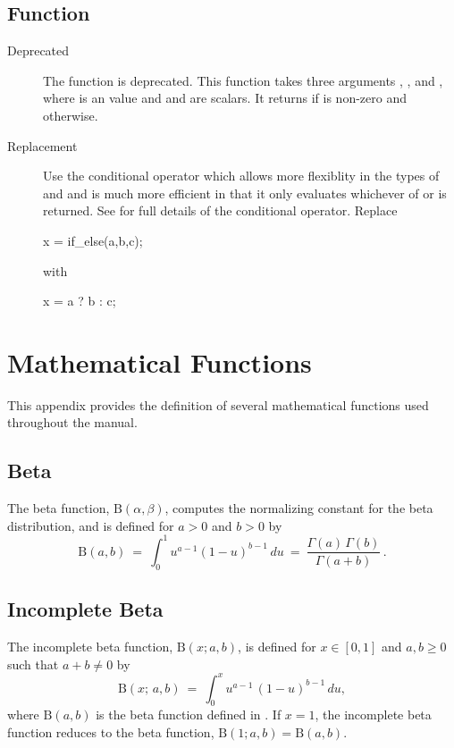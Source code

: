 \section{ Function}

\begin{description}
\item[Deprecated]The function  is deprecated.  This function takes three arguments
, , and , where  is an  value and  and 
are scalars. It returns  if  is non-zero and  otherwise.
%
\item[Replacement] Use the conditional operator which allows more
  flexiblity in the types of  and  and is much more
  efficient in that it only evaluates whichever of  or
   is returned.  See  for
  full details of the conditional operator.  Replace
\begin{stancode}
x = if_else(a,b,c);
\end{stancode}
 with
\begin{stancode}
x = a ? b : c;
\end{stancode}
\end{description}

\chapter{Mathematical Functions}\label{math-functions.appendix}

This appendix provides the definition of several mathematical
functions used throughout the manual.

\section{Beta}\label{beta-appendix.section}

The beta function, $\mbox{B}(\alpha,\beta)$, computes the normalizing
constant for the beta distribution, and is defined for $a > 0$ and $b
> 0$ by
%
\[
\mbox{B}(a,b)
\ = \
\int_0^1 u^{a - 1} (1 - u)^{b - 1} \, du
\ = \
\frac{\Gamma(a) \, \Gamma(b)}{\Gamma(a+b)} \, .
\]

\section{Incomplete Beta}\label{inc-beta-appendix.section}

The incomplete beta function, $\mathrm{B}(x; a, b)$, is defined for 
$x \in [0, 1]$ and $a, b \geq 0$ such that $a + b \neq 0$ by
\[
\mathrm{B}(x; \, a, b) 
\ = \
\int_0^x u^{a -  1} \, (1 - u)^{b - 1} \, du,
\]
%
where $\mathrm{B}(a, b)$ is the beta function defined in
.  If $x = 1$, the incomplete beta function
reduces to the beta function, $\mathrm{B}(1; a, b) = \mathrm{B}(a,
b)$.

